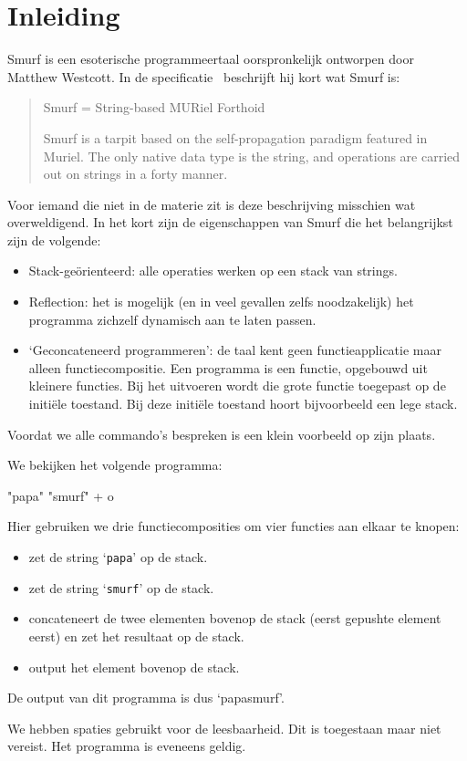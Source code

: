 \section{Inleiding}
\label{sec:intro}

Smurf is een esoterische programmeertaal oorspronkelijk ontworpen door Matthew
Westcott. In de specificatie~\cite{safalra} beschrijft hij kort wat Smurf is:
\begin{quote}
	Smurf = String-based MURiel Forthoid

	Smurf is a tarpit based on the self-propagation paradigm featured in Muriel.
	The only native data type is the string, and operations are carried out on
	strings in a forty manner.
\end{quote}
Voor iemand die niet in de materie zit is deze beschrijving misschien wat
overweldigend. In het kort zijn de eigenschappen
van Smurf die het belangrijkst zijn de volgende:
\begin{itemize}
	\item Stack-geörienteerd: alle operaties werken op een stack van strings.
	\item Reflection: het is mogelijk (en in veel gevallen zelfs noodzakelijk)
		het programma zichzelf dynamisch aan te laten passen.
	\item `Geconcateneerd programmeren': de taal kent geen functieapplicatie maar
		alleen functiecompositie. Een programma is een functie, opgebouwd uit
		kleinere functies. Bij het uitvoeren wordt die grote functie toegepast op
		de initiële toestand. Bij deze initiële toestand hoort bijvoorbeeld een
		lege stack.
\end{itemize}
Voordat we alle commando's bespreken is een klein voorbeeld op zijn plaats.

\begin{exmp}
	We bekijken het volgende programma:
	\begin{smurf}"papa" "smurf" + o\end{smurf}
	Hier gebruiken we drie functiecomposities om vier functies aan elkaar te
	knopen:
	\begin{itemize}
		\item {} zet de string `\texttt{papa}' op de stack.
		\item {} zet de string `\texttt{smurf}' op de stack.
		\item \smurfinline{+} concateneert de twee elementen bovenop de stack
			(eerst gepushte element eerst) en zet het resultaat op de stack.
		\item {} output het element bovenop de stack.
	\end{itemize}
	De output van dit programma is dus `papasmurf'.

	We hebben spaties gebruikt voor de leesbaarheid. Dit is toegestaan maar niet
	vereist. Het programma  is eveneens geldig.
\end{exmp}

